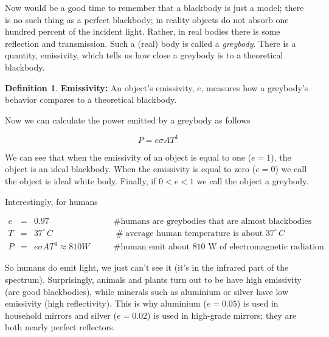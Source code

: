 \documentclass{article}
\theoremstyle{definition}
\newtheorem{definition}{Definition}[section]
\begin{document}
\bigskip
\noindent
Now would be a good time to remember that a blackbody is just a
model; there is no such thing as a perfect blackbody; in reality
objects do not absorb one hundred percent of the incident
light. Rather, in real bodies there is some reflection and
transmission. Such a (real) body is called a \emph{greybody}. 
There is a quantity, emissivity, which tells us how close
a greybody is to a theoretical blackbody.

\begin{definition}
{\bf Emissivity: } An object's emissivity, $e$, measures how a
greybody's behavior compares to a theoretical blackbody.
\end{definition}

\noindent
Now we can calculate the power emitted by a greybody
as follows 

\begin{equation}
P = e\sigma A T^4
\label{eqn:grey_body_power}
\end{equation}

\medskip
\noindent
We can see that when the emissivity of an object is equal to one
($e = 1$), the object is an ideal blackbody. When the emissivity
is equal to zero ($e = 0$) we call the object is ideal white
body. Finally, if $0 < e < 1$ we call the object a greybody.

\bigskip
\noindent
Interestingly, for humans

\begin{equation*}
\begin{array}{llll}
e &=& 0.97							&\qquad \mathrel{\#} \text{humans are greybodies that are almost blackbodies} \\
[5pt]
T &=& 37^{\circ} \, C				&\qquad \mathrel{\#} \text{average human temperature is about $37^{\circ} \, C$} \\
[5pt]
P &=& e \sigma A T^4 \approx 810 W	&\qquad \mathrel{\#} \text{human emit about 810 W of electromagnetic radiation} 
\end{array}
\end{equation*}

\bigskip
\noindent
So humans do emit light, we just can't see it (it's in the
infrared part of the spectrum).  Surprisingly, animals and plants
turn out to be have high emissivity (are good blackbodies),
while minerals such as aluminium or silver have low emissivity
(high reflectivity). This is why aluminium ($e = 0.05$) is used
in household mirrors and silver ($e = 0.02$) is used in
high-grade mirrors; they are both nearly perfect reflectors.
\end{document}
